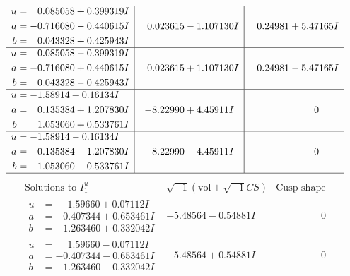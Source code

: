 \documentclass[1p]{elsarticle_modified}
\theoremstyle{definition}
\newcommand{\I}{\sqrt{-1}}
\begin{document}
$$\begin{array}{c|c|c}
\begin{aligned}
u &= \phantom{-}0.085058 + 0.399319 I \\
a &= -0.716080 - 0.440615 I \\
b &= \phantom{-}0.043328 + 0.425943 I\end{aligned}
 & \phantom{-}0.023615 - 1.107130 I & \phantom{-}0.24981 + 5.47165 I \\ \hline\begin{aligned}
u &= \phantom{-}0.085058 - 0.399319 I \\
a &= -0.716080 + 0.440615 I \\
b &= \phantom{-}0.043328 - 0.425943 I\end{aligned}
 & \phantom{-}0.023615 + 1.107130 I & \phantom{-}0.24981 - 5.47165 I \\ \hline\begin{aligned}
u &= -1.58914 + 0.16134 I \\
a &= \phantom{-}0.135384 + 1.207830 I \\
b &= \phantom{-}1.053060 + 0.533761 I\end{aligned}
 & -8.22990 + 4.45911 I & \phantom{-0.000000 } 0 \\ \hline\begin{aligned}
u &= -1.58914 - 0.16134 I \\
a &= \phantom{-}0.135384 - 1.207830 I \\
b &= \phantom{-}1.053060 - 0.533761 I\end{aligned}
 & -8.22990 - 4.45911 I & \phantom{-0.000000 } 0\\
 \hline 
 \end{array}$$\newpage$$\begin{array}{c|c|c}  
\text{Solutions to }I^u_{1}& \I (\text{vol} + \sqrt{-1}CS) & \text{Cusp shape}\\
 \hline 
\begin{aligned}
u &= \phantom{-}1.59660 + 0.07112 I \\
a &= -0.407344 + 0.653461 I \\
b &= -1.263460 + 0.332042 I\end{aligned}
 & -5.48564 - 0.54881 I & \phantom{-0.000000 } 0 \\ \hline\begin{aligned}
u &= \phantom{-}1.59660 - 0.07112 I \\
a &= -0.407344 - 0.653461 I \\
b &= -1.263460 - 0.332042 I\end{aligned}
 & -5.48564 + 0.54881 I & \phantom{-0.000000 } 0 \\ \hline\begin{aligned}

\end{aligned}
\end{array}$$
\end{document}
